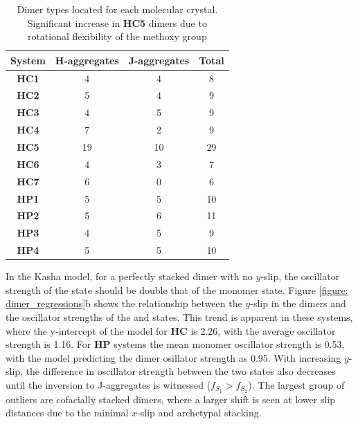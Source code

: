 \begin{table}
\caption[Dimer types for \textbf{HC} and \textbf{HP} molecular crystals]{Dimer types located for each molecular crystal. Significant increase in \textbf{HC5} dimers due to rotational flexibility of the methoxy group} 
  \label{table: dimer_types}
  \begin{tabular}{cccc}
  \hline
  System & H-aggregates & J-aggregates & Total\\
  \hline
  \textbf{HC1} & 4 & 4 & 8\\
  \textbf{HC2} & 5 & 4 & 9 \\
  \textbf{HC3} & 4 & 5 & 9\\
  \textbf{HC4} & 7 & 2 & 9\\
  \textbf{HC5} & 19 & 10 & 29 \\
  \textbf{HC6} & 4 & 3 & 7\\
  \textbf{HC7} & 6 & 0 & 6\\
  \hline
  \textbf{HP1} & 5 & 5 & 10\\
  \textbf{HP2} & 5 & 6 & 11\\
  \textbf{HP3} & 4 & 5 & 9\\
  \textbf{HP4} & 5 & 5 & 10\\
  \hline
  \end{tabular}
\end{table}

In the Kasha model, for a perfectly stacked dimer with no $y$-slip, the oscillator strength of the \stwo{} state should be double that of the monomer state. Figure \ref{figure: dimer_regressions}b shows the relationship between the $y$-slip in the dimers and the oscillator strengths of the \sone{} and \stwo{} states. This trend is apparent in these systems, where the y-intercept of the model for \textbf{HC} is 2.26, with the average oscillator strength is 1.16. For \textbf{HP} systems the mean monomer oscillator strength is 0.53, with the model predicting the dimer osillator strength as 0.95. With increasing $y$-slip, the difference in oscillator strength between the two states also decreases until the inversion to J-aggregates is witnessed ($f_{S_{1}}>f_{S_{2}}$). The largest group of outliers are cofacially stacked dimers, where a larger shift is seen at lower slip distances due to the minimal $x$-slip and archetypal stacking.\cite{Gierschner2016} 


